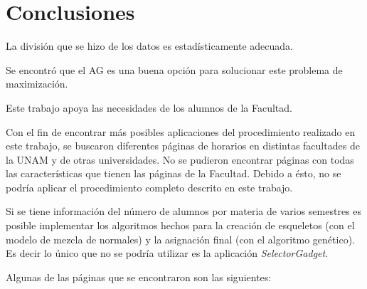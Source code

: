 \chapter{Conclusiones}

La división que se hizo de los datos es estadísticamente  adecuada.

Se encontró que el AG es una buena opción para solucionar este problema de maximización.

Este trabajo apoya las necesidades de los alumnos de la Facultad.

Con el fin de encontrar más posibles aplicaciones del procedimiento realizado en este trabajo, se buscaron diferentes páginas de horarios en distintas facultades de la UNAM y de otras universidades. No se pudieron encontrar páginas con todas las características que tienen las páginas de la Facultad. Debido a ésto, no se podría aplicar el procedimiento completo descrito en este trabajo.

Si se tiene información del número de alumnos por materia de varios semestres es posible implementar los algoritmos hechos para la creación de esqueletos (con el modelo de mezcla de normales) y la asignación final (con el algoritmo genético). Es decir lo único que no se podría utilizar es la aplicación \textit{SelectorGadget}.


Algunas de las páginas que se encontraron son las siguientes:

